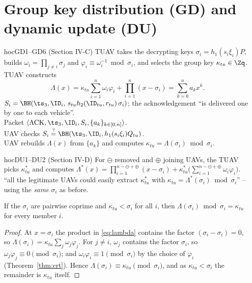 \section{Group key distribution (GD) and dynamic update (DU)}
\begin{stepbox}{hoc}{GD1--GD6 \;(Section IV-C)}
 TUAV takes the decrypting keys $\sigma_i=h_1(s_i\xi_i)P$, builds $\omega_i=\prod_{j\neq i}\sigma_j$ and $\varphi_i\equiv\omega_i^{-1}\bmod\sigma_i$,
and selects the group key $\kappa_{tu}\in\Zq$.\\
 TUAV constructs
\begin{equation}\label{eq:lambda}
\Lambda(x)=\kappa_{tu}\sum_{i=1}^n\omega_i\varphi_i+\prod_{i=1}^n(x-\sigma_i)=\sum_{k=0}^{n}a_kx^k .
\end{equation}
 $S_i=\BH(\ts_3,\ID_i,\,s_{tu}h_2(\ID_{tu},r_{tu})\,\sigma_i)$; the acknowledgement ``is delivered one by one to each vehicle''.\\
 Packet $\langle\text{ACK},\ts_3,\ID_i,S_i,\{a_k\}_{k\in[0,n]}\rangle$.\\
 UAV checks $S_i\overset{?}{=}\BH(\ts_3,\ID_i,h_1(s_i\xi_i)Q_{tu})$.\\
 UAV rebuilds $\Lambda(x)$ from $\{a_k\}$ and computes $\kappa_{tu}=\Lambda(\sigma_i)\bmod\sigma_i$.
\end{stepbox}
\begin{stepbox}{hoc}{DU1--DU2 \;(Section IV-D)}
 For $\ominus$ removed and $\oplus$ joining UAVs, the TUAV picks $\kappa^*_{tu}$ and computes
$\Lambda^*(x)=\prod_{i=1}^{n-\ominus+\oplus}(x-\sigma_i)+\kappa^*_{tu}\big(\sum_{i=1}^{n-\ominus+\oplus}\omega_i\varphi_i\big)$.\\
 ``all the legitimate UAVs could easily extract $\kappa^*_{tu}$ with $\kappa_{tu}=\Lambda^*(\sigma_i)\bmod\sigma_i$'' -- using the
\emph{same} $\sigma_i$ as before.
\end{stepbox}

\begin{lemma}\label{lem:gd6}
If the $\sigma_i$ are pairwise coprime and $\kappa_{tu}<\sigma_i$ for all $i$, then $\Lambda(\sigma_i)\bmod\sigma_i=\kappa_{tu}$ for every member $i$.
\end{lemma}
\begin{proof}
At $x=\sigma_i$ the product in \eqref{eq:lambda} contains the factor $(\sigma_i-\sigma_i)=0$, so $\Lambda(\sigma_i)=\kappa_{tu}\sum_j\omega_j\varphi_j$.
For $j\neq i$, $\omega_j$ contains the factor $\sigma_i$, so $\omega_j\varphi_j\equiv0\pmod{\sigma_i}$; and $\omega_i\varphi_i\equiv1\pmod{\sigma_i}$ by
the choice of $\varphi_i$ (Theorem~\ref{thm:crt}). Hence $\Lambda(\sigma_i)\equiv\kappa_{tu}\pmod{\sigma_i}$, and as $\kappa_{tu}<\sigma_i$ the remainder
is $\kappa_{tu}$ itself.
\end{proof}

